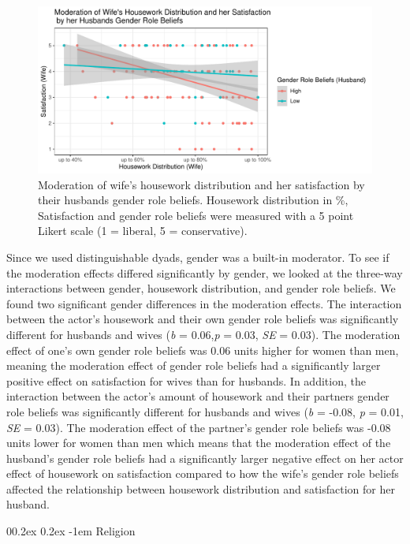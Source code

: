 \documentclass[
  man,floatsintext]{apa6}
\makeatletter
\let\oldparagraph\paragraph
\renewcommand{\paragraph}[1]{\oldparagraph{#1}\mbox{}}
\renewcommand{\paragraph}{\@startsection{paragraph}{4}{\parindent}%
  {0\baselineskip \@plus 0.2ex \@minus 0.2ex}%
  {-1em}%
  {\normalfont\normalsize\bfseries\itshape\typesectitle}}
\makeatother
\begin{document}
\begin{figure}
\centering
\includegraphics{Final_Paper_files/figure-latex/unnamed-chunk-58-1.pdf}
\caption{\label{fig:unnamed-chunk-58}Moderation of wife's housework distribution and her satisfaction by their husbands gender role beliefs. Housework distribution in \%, Satisfaction and gender role beliefs were measured with a 5 point Likert scale (1 = liberal, 5 = conservative).}
\end{figure}

Since we used distinguishable dyads, gender was a built-in moderator. To see if the moderation effects differed significantly by gender, we looked at the three-way interactions between gender, housework distribution, and gender role beliefs. We found two significant gender differences in the moderation effects. The interaction between the actor's housework and their own gender role beliefs was significantly different for husbands and wives (\emph{b} = 0.06,\emph{p} = 0.03, \emph{SE} = 0.03). The moderation effect of one's own gender role beliefs was 0.06 units higher for women than men, meaning the moderation effect of gender role beliefs had a significantly larger positive effect on satisfaction for wives than for husbands.
In addition, the interaction between the actor's amount of housework and their partners gender role beliefs was significantly different for husbands and wives (\emph{b} = -0.08, \emph{p} = 0.01, \emph{SE} = 0.03). The moderation effect of the partner's gender role beliefs was -0.08 units lower for women than men which means that the moderation effect of the husband's gender role beliefs had a significantly larger negative effect on her actor effect of housework on satisfaction compared to how the wife's gender role beliefs affected the relationship between housework distribution and satisfaction for her husband.

\hypertarget{religion}{%
\paragraph{Religion}\label{religion}}
\end{document}
